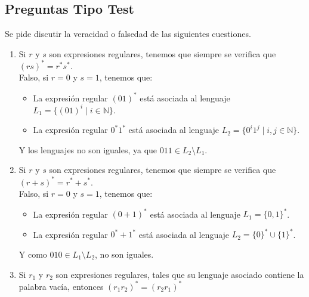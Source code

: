 \subsection{Preguntas Tipo Test}
Se pide discutir la veracidad o falsedad de las siguientes cuestiones.
\begin{enumerate}
    \item Si $r$ y $s$ son expresiones regulares, tenemos que siempre se verifica que ${(rs)}^{\ast}=r^\ast s^\ast$.\\

        Falso, si $r = 0$ y $s = 1$, tenemos que:
        \begin{itemize}
            \item La expresión regular ${(01)}^{\ast}$ está asociada al lenguaje $L_1 = \{{(01)}^{i}\mid i \in \mathbb{N}\}$.
            \item La expresión regular $0^\ast 1^\ast$ está asociada al lenguaje $L_2 = \{0^i 1^j \mid i,j\in \mathbb{N}\}$.
        \end{itemize}
        Y los lenguajes no son iguales, ya que $011\in L_2 \setminus L_1$.
    \item Si $r$ y $s$ son expresiones regulares, tenemos que siempre se verifica que ${(r+s)}^{\ast} = r^\ast + s^\ast$.\\

        Falso, si $r = 0$ y $s= 1$, tenemos que:
        \begin{itemize}
            \item La expresión regular ${(0+1)}^{\ast}$ está asociada al lenguaje $L_1={\{0,1\}}^{\ast}$.
            \item La expresión regular $0^\ast + 1^\ast$ está asociada al lenguaje $L_2 = {\{0\}}^{\ast}\cup {\{1\}}^{\ast}$.
        \end{itemize}
        Y como $010\in L_1\setminus L_2$, no son iguales.
    \item Si $r_1$ y $r_2$ son expresiones regulares, tales que su lenguaje asociado contiene la palabra vacía, entonces ${(r_1r_2)}^{\ast}={(r_2r_1)}^{\ast}$\\


\end{enumerate}
